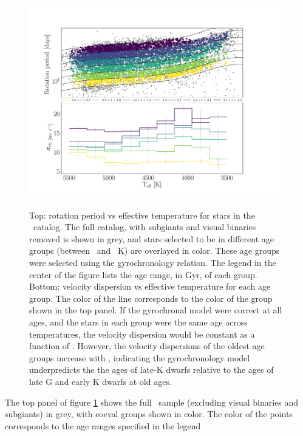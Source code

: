 \begin{figure}
  \caption{
Top: rotation period vs effective temperature for stars in the \mct\
    catalog.
    The full catalog, with subgiants and visual binaries removed is shown in
    grey, and stars selected to be in different age groups (between \tmin\ and
    \tmax\ K) are overlayed in color.
These age groups were selected using the \citet{angus2019} gyrochronology
    relation.
The legend in the center of the figure lists the age range, in Gyr, of each
    group.
Bottom: velocity dispersion vs effective temperature for each age
    group.
The color of the line corresponds to the color of the group shown in the top
    panel.
If the gyrochronal model were correct at all ages, and the stars in each group
    were the same age across temperatures, the velocity dispersion would be
    constant as a function of \teff.
However, the velocity dispersions of the oldest age groups increase with
    \teff, indicating the \citet{angus2019} gyrochronology model underpredicts
    the the ages of late-K dwarfs relative to the ages of late G and early K
    dwarfs at old ages.
}
  \centering
    \includegraphics[width=1\textwidth]{age_cut}
\label{fig:age_cut}
\end{figure}
The top panel of figure \ref{fig:age_cut} shows the full \mct\ sample
(excluding visual binaries and subgiants) in grey, with coeval groups
\citep[according to the][relation]{angus2019} shown in color.
The color of the points corresponds to the age ranges specified in the legend
